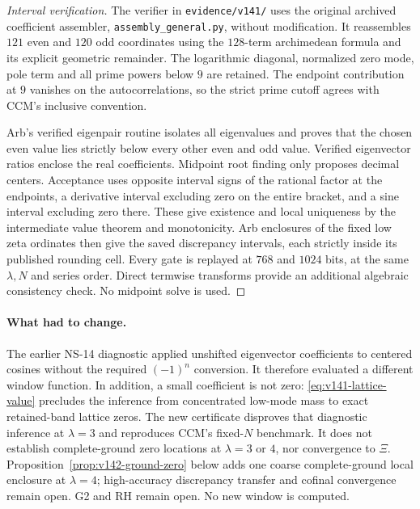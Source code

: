 \documentclass[11pt]{article}
\theoremstyle{remark}
\begin{document}
\begin{proof}[Interval verification]
The verifier in \texttt{evidence/v141/} uses the original archived
coefficient assembler, \texttt{assembly\_general.py}, without modification.
It reassembles $121$ even and $120$ odd coordinates using the
$128$-term archimedean formula and its explicit geometric remainder.
The logarithmic diagonal, normalized zero mode, pole term and all
prime powers below $9$ are retained. The endpoint contribution at
$9$ vanishes on the autocorrelations, so the strict prime cutoff
agrees with CCM's inclusive convention.

Arb's verified eigenpair routine isolates all eigenvalues and proves
that the chosen even value lies strictly below every other even and
odd value. Verified eigenvector ratios enclose the real coefficients.
Midpoint root finding only proposes decimal centers. Acceptance uses
opposite interval signs of the rational factor at the endpoints,
a derivative interval excluding zero on the entire bracket, and a
sine interval excluding zero there. These give existence and local
uniqueness by the intermediate value theorem and monotonicity.
Arb enclosures of the fixed low zeta ordinates then give the saved
discrepancy intervals, each strictly inside its published rounding
cell. Every gate is replayed at $768$ and $1024$ bits, at the same
$\lambda,N$ and series order. Direct termwise transforms provide an
additional algebraic consistency check. No midpoint solve is used.
\end{proof}

\paragraph{What had to change.}
The earlier NS-14 diagnostic applied unshifted eigenvector coefficients
to centered cosines without the required $(-1)^n$ conversion. It
therefore evaluated a different window function. In addition, a small
coefficient is not zero: \eqref{eq:v141-lattice-value} precludes the
inference from concentrated low-mode mass to exact retained-band
lattice zeros. The new certificate disproves that diagnostic inference
at $\lambda=3$ and reproduces CCM's fixed-$N$ benchmark. It does not
establish complete-ground zero locations at $\lambda=3$ or $4$, nor
convergence to $\Xi$. Proposition~\ref{prop:v142-ground-zero} below
adds one coarse complete-ground local enclosure at $\lambda=4$;
high-accuracy discrepancy transfer and cofinal convergence remain open.
G2 and RH remain open. No new window is computed.
\end{document}
